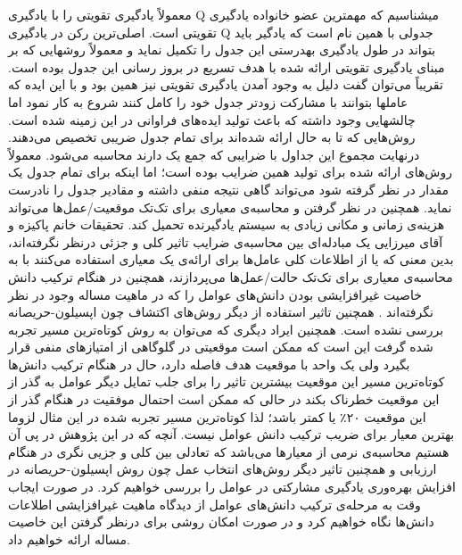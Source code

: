 \documentclass[12pt,a4paper]{article}
\begin{document}
معمولاً یادگیری تقویتی را با یادگیری Q میشناسیم که مهمترین عضو خانواده یادگیری تقویتی است. اصلی‌ترین رکن در
یادگیری Q جدولی با همین نام است که یادگیر باید بتواند در طول یادگیری بهدرستی این جدول را تکمیل نماید و معمولاً روشهایی
که بر مبنای یادگیری تقویتی ارائه شده با هدف تسریع در بروز رسانی این جدول بوده است. تقریباً می‌توان گفت دلیل به وجود
آمدن یادگیری تقویتی نیز همین بود و با این ایده که عاملها بتوانند با مشارکت زودتر جدول خود را کامل کنند شروع به کار نمود
اما چالشهایی وجود داشته که باعث تولید ایده‌های فراوانی در این زمینه شده است.
روش‌هایی که تا به حال ارائه‌ شده‌اند برای تمام جدول ضریبی تخصیص می‌دهند. درنهایت مجموع این جداول با ضرایبی که
جمع یک دارند محاسبه می‌شود. معمولاً روش‌های ارائه‌ شده برای تولید همین ضرایب بوده است؛ اما اینکه برای تمام جدول یک
مقدار در نظر گرفته شود می‌تواند گاهی نتیجه منفی داشته و مقادیر جدول را نادرست نماید. همچنین در نظر گرفتن و محاسبه‌ی معیاری برای تک‌تک موقعیت/عمل‌ها می‌تواند هزینه‌ی زمانی و مکانی زیادی به سیستم یادگیرنده تحمیل کند.
تحقیقات خانم پاکیزه و آقای میرزایی  یک مبادله‌ای بین محاسبه‌ی ضرایب تاثیر کلی و جزئی درنظر نگرفته‌اند، بدین معنی که یا از اطلاعات کلی عامل‌ها برای ارائه‌ی یک معیاری استفاده می‌کنند با به محاسبه‌ی معیاری برای تک‌تک حالت/عمل‌ها می‌پردازند، همچنین در هنگام ترکیب دانش خاصیت غیرافزایشی بودن دانش‌های عوامل را که در ماهیت مساله وجود در نظر نگرفته‌اند . همچنین تاثیر استفاده از دیگر روش‌های اکتشاف چون اپسیلون-حریصانه بررسی نشده است. همچنین ایراد دیگری که می‌توان به روش کوتاه‌ترین مسیر تجربه شده گرفت این است که ممکن است موقعیتی در گلوگاهی از امتیاز‌های منفی قرار بگیرد ولی یک واحد با موقعیت هدف فاصله دارد، حال در هنگام ترکیب دانش‌ها کوتاه‌ترین مسیر این موقعیت بیشترین تاثیر را برای جلب تمایل دیگر عوامل به گذر از این موقعیت خطرناک بکند در حالی که ممکن است احتمال موفقیت در هنگام گذر از این موقعیت ۲۰٪ یا کمتر باشد؛ لذا کوتاه‌ترین مسیر تجربه شده در این مثال لزوما بهترین معیار برای ضریب ترکیب دانش عوامل نیست.
آنچه که در این پژوهش در پی آن هستیم محاسبه‌ی نرمی از معیار‌ها می‌باشد که تعادلی بین کلی و جزیی نگری در هنگام ارزیابی و همچنین تاثیر دیگر روش‌های انتخاب عمل چون روش اپسیلون-حریصانه در افزایش بهره‌وری یادگیری مشارکتی در عوامل را بررسی خواهیم کرد. در صورت ایجاب وقت به مرحله‌ی ترکیب دانش‌های عوامل از دیدگاه ماهیت غیرافزایشی اطلاعات دانش‌ها نگاه خواهیم کرد و در صورت امکان روشی برای درنظر گرفتن این خاصیت مساله ارائه خواهیم داد.
\end{document}
